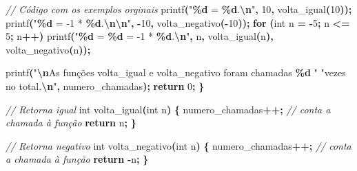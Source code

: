 \documentclass[
  11pt,
  a4paper,
]{scrbook}
\newenvironment{Shaded}{\begin{snugshade}}{\end{snugshade}}
\newcommand{\CommentTok}[1]{\textcolor[rgb]{0.56,0.35,0.01}{\textit{#1}}}
\newcommand{\ControlFlowTok}[1]{\textcolor[rgb]{0.13,0.29,0.53}{\textbf{#1}}}
\newcommand{\DataTypeTok}[1]{\textcolor[rgb]{0.13,0.29,0.53}{#1}}
\newcommand{\DecValTok}[1]{\textcolor[rgb]{0.00,0.00,0.81}{#1}}
\newcommand{\NormalTok}[1]{#1}
\newcommand{\OperatorTok}[1]{\textcolor[rgb]{0.81,0.36,0.00}{\textbf{#1}}}
\newcommand{\SpecialCharTok}[1]{\textcolor[rgb]{0.81,0.36,0.00}{\textbf{#1}}}
\newcommand{\StringTok}[1]{\textcolor[rgb]{0.31,0.60,0.02}{#1}}
\begin{document}
\begin{Shaded}
\begin{Highlighting}[]
    \CommentTok{// Código com os exemplos orginais}
\NormalTok{    printf}\OperatorTok{(}\StringTok{"}\SpecialCharTok{\%d}\StringTok{ = }\SpecialCharTok{\%d}\StringTok{.}\SpecialCharTok{\textbackslash{}n}\StringTok{"}\OperatorTok{,} \DecValTok{10}\OperatorTok{,}\NormalTok{ volta\_igual}\OperatorTok{(}\DecValTok{10}\OperatorTok{));}
\NormalTok{    printf}\OperatorTok{(}\StringTok{"}\SpecialCharTok{\%d}\StringTok{ = {-}1 * }\SpecialCharTok{\%d}\StringTok{.}\SpecialCharTok{\textbackslash{}n\textbackslash{}n}\StringTok{"}\OperatorTok{,} \OperatorTok{{-}}\DecValTok{10}\OperatorTok{,}\NormalTok{ volta\_negativo}\OperatorTok{({-}}\DecValTok{10}\OperatorTok{));}
    \ControlFlowTok{for} \OperatorTok{(}\DataTypeTok{int}\NormalTok{ n }\OperatorTok{=} \OperatorTok{{-}}\DecValTok{5}\OperatorTok{;}\NormalTok{ n }\OperatorTok{\textless{}=} \DecValTok{5}\OperatorTok{;}\NormalTok{ n}\OperatorTok{++)}
\NormalTok{        printf}\OperatorTok{(}\StringTok{"}\SpecialCharTok{\%d}\StringTok{ = }\SpecialCharTok{\%d}\StringTok{ = {-}1 * }\SpecialCharTok{\%d}\StringTok{.}\SpecialCharTok{\textbackslash{}n}\StringTok{"}\OperatorTok{,}\NormalTok{ n}\OperatorTok{,}\NormalTok{ volta\_igual}\OperatorTok{(}\NormalTok{n}\OperatorTok{),}\NormalTok{ volta\_negativo}\OperatorTok{(}\NormalTok{n}\OperatorTok{));}

\NormalTok{    printf}\OperatorTok{(}\StringTok{"}\SpecialCharTok{\textbackslash{}n}\StringTok{As funções volta\_igual e volta\_negativo foram chamadas }\SpecialCharTok{\%d}\StringTok{ "}
           \StringTok{"vezes no total.}\SpecialCharTok{\textbackslash{}n}\StringTok{"}\OperatorTok{,}\NormalTok{ numero\_chamadas}\OperatorTok{);}
    \ControlFlowTok{return} \DecValTok{0}\OperatorTok{;}
\OperatorTok{\}}

\CommentTok{// Retorna igual}
\DataTypeTok{int}\NormalTok{ volta\_igual}\OperatorTok{(}\DataTypeTok{int}\NormalTok{ n}\OperatorTok{)} \OperatorTok{\{}
\NormalTok{    numero\_chamadas}\OperatorTok{++;}  \CommentTok{// conta a chamada à função}
    \ControlFlowTok{return}\NormalTok{ n}\OperatorTok{;}
\OperatorTok{\}}

\CommentTok{// Retorna negativo}
\DataTypeTok{int}\NormalTok{ volta\_negativo}\OperatorTok{(}\DataTypeTok{int}\NormalTok{ n}\OperatorTok{)} \OperatorTok{\{}
\NormalTok{    numero\_chamadas}\OperatorTok{++;}  \CommentTok{// conta a chamada à função}
    \ControlFlowTok{return} \OperatorTok{{-}}\NormalTok{n}\OperatorTok{;}
\OperatorTok{\}}
\end{Highlighting}
\end{Shaded}
\end{document}
